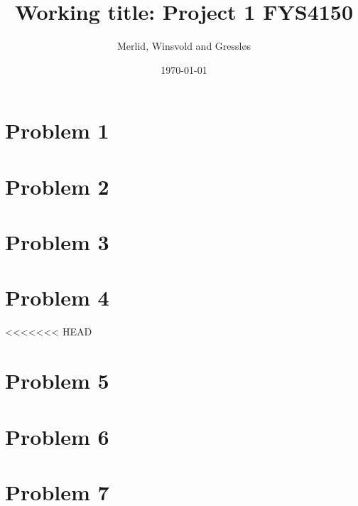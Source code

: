 \documentclass[aps,rmp,preprint,amsmath,amssymb,longbibliography,floatfix]{revtex4-1}
\begin{document}
\title{Working title: Project 1 FYS4150}

\author{Merlid, Winsvold and Gressløs}
\date{\today}


\begin{abstract}

\end{abstract}

\maketitle

\tableofcontents

\section{Problem 1}
\label{sec:prob1}


\section{Problem 2}
\label{sec:prob2}


\section{Problem 3}
\label{sec:prob3}


\section{Problem 4}
\label{sec:prob4}

<<<<<<< HEAD
\section{Problem 5}
\label{sec:prob5}

\section{Problem 6}
\label{sec:prob6}

\section{Problem 7}
\label{sec:prob7}
\end{document}
